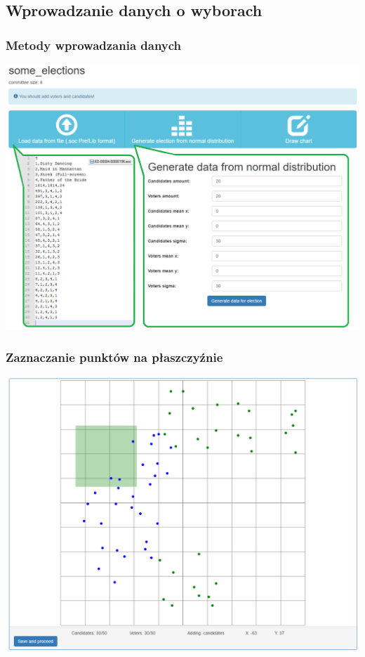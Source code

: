 \documentclass{beamer}
\begin{document}
\subsection{Wprowadzanie danych o wyborach}
\begin{frame}
\frametitle{Metody wprowadzania danych}
\includegraphics[width=0.7\paperwidth]{pics/three_options.png}
\end{frame}

\begin{frame}
\frametitle{Zaznaczanie punktów na płaszczyźnie}
\includegraphics[width=0.7\paperwidth]{pics/paint.png}
\end{frame}
\end{document}
